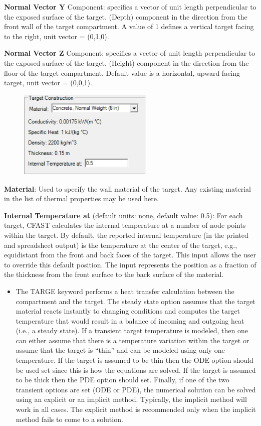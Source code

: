 \textbf{Normal Vector Y} Component: specifies a vector of unit length perpendicular to the exposed surface of the target. (Depth) component in the direction from the front wall of the target compartment. A value of 1 defines a vertical target facing to the right, unit vector = (0,1,0).

\textbf{Normal Vector Z} Component: specifies a vector of unit length perpendicular to the exposed surface of the target. (Height) component in the direction from the floor of the target compartment. Default value is a horizontal, upward facing target, unit vector = (0,0,1).

\begin{figure}
  \includegraphics[width=2.531in]{FIGURES/Input_File/Target_Construction}
\end{figure}

\textbf{Material}: Used to specify the wall material of the target.  Any existing material in the list of thermal properties may be used here.

\textbf{Internal Temperature at} (default units: none, default value: 0.5): For each target, CFAST calculates the internal temperature at a number of node points within the target. By default, the reported internal temperature (in the printed and spreadsheet output) is the temperature at the center of the target, e.g., equidistant from the front and back faces of the target. This input allows the user to override this default position. The input represents the position as a fraction of the thickness from the front surface to the back surface of the material.

\begin{itemize}
\item The TARGE keyword performs a heat transfer calculation between the compartment and the target. The steady state option assumes that the target material reacts instantly to changing conditions and computes the target temperature that would result in a balance of incoming and outgoing heat (i.e., a steady state). If a transient target temperature is modeled, then one can either assume that there is a temperature variation within the target or assume that the target is “thin” and can be modeled using only one temperature. If the target is assumed to be thin then the ODE option should be used set since this is how the equations are solved. If the target is assumed to be thick then the PDE option should set. Finally, if one of the two transient options are set (ODE or PDE), the numerical solution can be solved using an explicit or an implicit method.  Typically, the implicit method will work in all cases.  The explicit method is recommended only when the implicit method fails to come to a solution.

\end{itemize}

